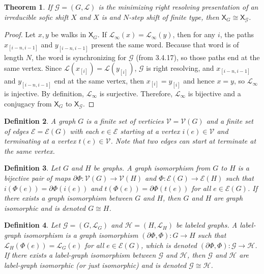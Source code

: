 \documentclass{article}
\newcommand{\Lc}{\mathcal{L}}  %
\newcommand{\Gc}{\mathcal{G}}  %
\newcommand{\Hc}{\mathcal{H}}  %
\newcommand{\Vc}{\mathcal{V}}
\newcommand{\Ec}{\mathcal{E}}
\newcommand{\shift}[1]{\mathsf{X}_{#1}}
\newcommand{\term}[1]{\textit{#1}}
\newtheorem{theorem}{Theorem}
\newtheorem{definition}[theorem]{Definition}
\begin{document}
    \begin{theorem}
        If \(\mathcal{G} = (G, \mathcal{L})\) is the minimizing right resolving
        presentation of an irreducible sofic shift \(X\) and \(X\) is and
        \(N\)-step shift of finite type, then \(\shift{G} \cong \shift{\Gc}\).
    \end{theorem}
    \begin{proof}
        Let \(x, y\) be walks in \(\shift{G}\). If \(\mathcal{L}_\infty(x)=\mathcal{L}_\infty(y)\),
        then for any \(i\), the paths \(x_{[i-n, i-1]}\) and \(y_{[i-n, i-1]}\) present 
        the same word. Because that word is of length \(N\), the word is synchronizing
        for \(\mathcal{G}\) (from 3.4.17), so those paths end at the same vertex. Since
        \(\mathcal{L}(x_{[i]}) = \mathcal{L}(y_{[i]})\), \(\mathcal{G}\) is right 
        resolving, and \(x_{[i-n, i-1]}\) and \(y_{[i-n, i-1]}\) end at the same vertex,
        then \(x_{[i]} = y_{[i]}\) and hence \(x = y\), so \(\mathcal{L}_\infty\) is injective.
        By definition, \(\mathcal{L}_\infty\) is surjective. Therefore, \(\mathcal{L}_\infty\) is bijective and 
        a conjugacy from \(\mathsf{X}_G\) to \(\mathsf{X}_\mathcal{G}\).
    \end{proof}

    \begin{definition}
        A \term{graph} \(G\) is a finite set of \term{verticies} \(\Vc=\Vc(G)\) and a finite set 
        of edges \(\Ec = \Ec(G)\) with each \(e \in \Ec\) starting at a vertex \(i(e) \in \Vc\)
        and terminating at a vertex \(t(e) \in \Vc\). Note that two edges can start at terminate
        at the same vertex.
    \end{definition}

    \begin{definition}
        Let \(G\) and \(H\) be graphs. A \term{graph isomorphism from \(G\) to \(H\)}
        is a bijective pair of maps \(\partial \Phi : \Vc(G) \to \Vc(H)\) and \(\Phi : \Ec(G) \to \Ec(H)\)
        such that \(i(\Phi(e)) = \partial \Phi(i(e))\) and \(t(\Phi(e)) = \partial \Phi(t(e))\)
        for all \(e \in \Ec(G)\). If there exists a graph isomorphism between \(G\) and \(H\),
        then \(G\) and \(H\) are graph isomorphic and is denoted \(G \cong H\).
    \end{definition}

    \begin{definition}
        Let \(\Gc = (G, \Lc_G)\) and \(\Hc = (H, \Lc_H)\) be labeled graphs.
        A label-graph isomorphism is a graph isomorphism \((\partial \Phi, \Phi) : G \to H\)
        such that \(\Lc_H(\Phi(e)) = \Lc_G(e)\) for all \(e \in \Ec(G)\), which is 
        denoted \((\partial \Phi, \Phi) : \Gc \to \Hc\). If there exists a label-graph 
        isomorphism between \(\Gc\) and \(\Hc\), then \(\Gc\) and \(\Hc\) are label-graph
        isomorphic (or just isomorphic) and is denoted \(\Gc \cong \Hc\).
    \end{definition}
\end{document}
